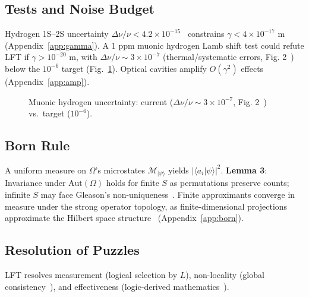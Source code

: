 \documentclass[aps,prx,twocolumn]{revtex4-2}
\begin{document}
\subsection{Tests and Noise Budget}
Hydrogen 1S–2S uncertainty $\Delta\nu/\nu < 4.2 \times 10^{-15}$~\cite{parthey2011} constrains $\gamma < 4 \times 10^{-17}$ m (Appendix~\ref{app:gamma}). A 1 ppm muonic hydrogen Lamb shift test could refute LFT if $\gamma > 10^{-20}$ m, with $\Delta\nu/\nu \sim 3 \times 10^{-7}$ (thermal/systematic errors, Fig. 2~\cite{antal2013}) below the $10^{-6}$ target (Fig.~\ref{fig:noise}). Optical cavities amplify $O(\gamma^2)$ effects (Appendix~\ref{app:amp}).

\begin{figure}[ht]
\centering
{}
\caption{Muonic hydrogen uncertainty: current ($\Delta\nu/\nu \sim 3 \times 10^{-7}$, Fig. 2~\cite{antal2013}) vs.\ target ($10^{-6}$).}
\label{fig:noise}
\end{figure}

\subsection{Born Rule}
\label{sec:born}
A uniform measure on $\Omega$’s microstates $\mathcal{M}_{|\psi\rangle}$ yields $|\langle a_i | \psi \rangle|^2$. \textbf{Lemma 3}: Invariance under $\mathrm{Aut}(\Omega)$ holds for finite $S$ as permutations preserve counts; infinite $S$ may face Gleason’s non-uniqueness~\cite{gleason1975}. Finite approximants converge in measure under the strong operator topology, as finite-dimensional projections approximate the Hilbert space structure~\cite{reed1980} (Appendix~\ref{app:born}).

\subsection{Resolution of Puzzles}
LFT resolves measurement (logical selection by $L$), non-locality (global consistency~\cite{bell1964}), and effectiveness (logic-derived mathematics~\cite{wigner1960}).
\end{document}
